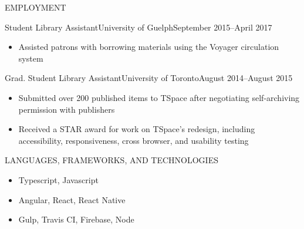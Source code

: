 \documentclass[]{mcdowellcv}
\begin{document}
	\begin{cvsection}{EMPLOYMENT}
		\begin{cvsubsection}{Student Library Assistant}{University of Guelph}{September 2015--April 2017}
			\begin{itemize}
				\item Assisted patrons with borrowing materials using the Voyager circulation system
			\end{itemize}
		\end{cvsubsection}
		
		
		\begin{cvsubsection}{Grad. Student Library Assistant}{University of Toronto}{August 2014--August 2015}		
			\begin{itemize}
                \item Submitted over 200 published items to TSpace after negotiating self-archiving permission with publishers
                \item Received a STAR award for work on TSpace's redesign, including accessibility, responsiveness, cross browser, and usability testing
			\end{itemize}
		\end{cvsubsection}
		
	\end{cvsection}

	\begin{cvsection}{LANGUAGES, FRAMEWORKS, AND TECHNOLOGIES}
		\begin{cvsubsection}{}{}{}	
			\begin{itemize}
				\item Typescript, Javascript
				\item Angular, React, React Native
				\item Gulp, Travis CI, Firebase, Node
			\end{itemize}
		\end{cvsubsection}
	\end{cvsection}
	
\end{document}
